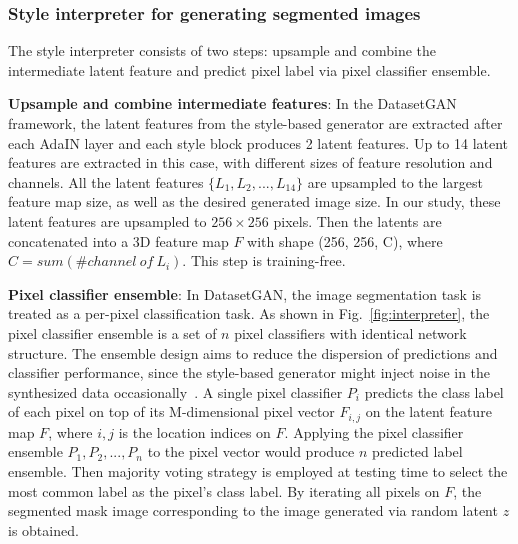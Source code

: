 \documentclass[conference]{IEEEtran}
\begin{document}
\subsubsection{Style interpreter for generating segmented images}
\label{sec:interpreter}
The style interpreter consists of two steps: upsample and combine the intermediate latent feature and predict pixel label via pixel classifier ensemble. 

\noindent \textbf{Upsample and combine intermediate features}: 
\label{sec:extactor}
In the DatasetGAN framework, the latent features from the style-based generator are extracted after each AdaIN layer and each style block produces 2 latent features. Up to 14 latent features are extracted in this case, with different sizes of feature resolution and channels. 
All the latent features $\{L_1, L_2, ..., L_14\}$ are upsampled to the largest feature map size, as well as the desired generated image size. 
In our study, these latent features are upsampled to $256\times 256$ pixels. Then the latents are concatenated into a 3D feature map $F$ with shape (256, 256, C), where $C=sum(\# channel\ of\ L_i)$. 
This step is training-free.


\noindent \textbf{Pixel classifier ensemble}:
\label{sec:classifier}
In DatasetGAN, the image segmentation task is treated as a per-pixel classification task. 
As shown in Fig.~\ref{fig:interpreter}, the pixel classifier ensemble is a set of $n$ pixel classifiers with identical network structure. 
The ensemble design aims to reduce the dispersion of predictions and classifier performance, since the style-based generator might inject noise in the synthesized data occasionally~\cite{Karras2020AnalyzingAI}. 
A single pixel classifier $P_i$ predicts the class label of each pixel on top of its M-dimensional pixel vector $F_{i,j}$ on the latent feature map $F$, where $i,j$ is the location indices on $F$. 
Applying the pixel classifier ensemble ${P_1, P_2, ..., P_n}$ to the pixel vector would produce $n$ predicted label ensemble. Then majority voting strategy is employed at testing time to select the most common label as the pixel's class label. 
By iterating all pixels on $F$, the segmented mask image corresponding to the image generated via random latent $z$ is obtained.   
\end{document}
